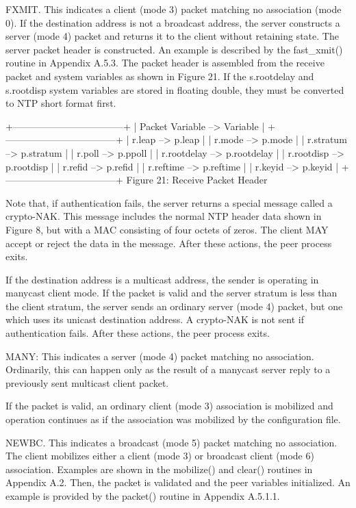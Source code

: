 FXMIT. This indicates a client (mode 3) packet matching no
association (mode 0). If the destination address is not a broadcast
address, the server constructs a server (mode 4) packet and returns
it to the client without retaining state. The server packet header
is constructed. An example is described by the fast_xmit() routine
in Appendix A.5.3. The packet header is assembled from the receive
packet and system variables as shown in Figure 21. If the
s.rootdelay and s.rootdisp system variables are stored in floating
double, they must be converted to NTP short format first.

+-----------------------------------+
| Packet Variable --> Variable |
+-----------------------------------+
| r.leap --> p.leap |
| r.mode --> p.mode |
| r.stratum --> p.stratum |
| r.poll --> p.ppoll |
| r.rootdelay --> p.rootdelay |
| r.rootdisp --> p.rootdisp |
| r.refid --> p.refid |
| r.reftime --> p.reftime |
| r.keyid --> p.keyid |
+-----------------------------------+
Figure 21: Receive Packet Header

Note that, if authentication fails, the server returns a special
message called a crypto-NAK. This message includes the normal NTP
header data shown in Figure 8, but with a MAC consisting of four
octets of zeros. The client MAY accept or reject the data in the
message. After these actions, the peer process exits.

If the destination address is a multicast address, the sender is
operating in manycast client mode. If the packet is valid and the
server stratum is less than the client stratum, the server sends an
ordinary server (mode 4) packet, but one which uses its unicast
destination address. A crypto-NAK is not sent if authentication
fails. After these actions, the peer process exits.

MANY: This indicates a server (mode 4) packet matching no
association. Ordinarily, this can happen only as the result of a
manycast server reply to a previously sent multicast client packet.

If the packet is valid, an ordinary client (mode 3) association is
mobilized and operation continues as if the association was mobilized
by the configuration file.

NEWBC. This indicates a broadcast (mode 5) packet matching no
association. The client mobilizes either a client (mode 3) or
broadcast client (mode 6) association. Examples are shown in the
mobilize() and clear() routines in Appendix A.2. Then, the packet is
validated and the peer variables initialized. An example is provided
by the packet() routine in Appendix A.5.1.1.

